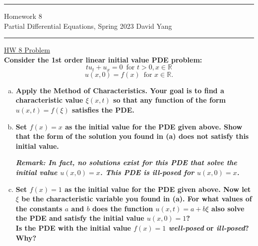 \documentclass[11pt]{article}
\begin{document}
	\hrule
	\begin{center}
		{\Large Homework 8} \\ %
		\vspace{0.2cm}
		Partial Differential Equations, Spring 2023 \hfill David Yang %
	\end{center}

\hrule

\vspace{1em}


\underline{HW 8 Problem} \\

\textbf{Consider the 1st order linear initial value PDE problem:
\[tu_t + u_x = 0 \, \, \, \text{for } t > 0, x \in \mathbb{R}\]
\[ u(x, 0) = f(x) \, \, \, \text{for } x \in \mathbb{R}.\]}

\begin{enumerate}[(a)]
    \item \textbf{Apply the Method of Characteristics. Your goal is to find a characteristic value $\xi(x, t)$ so that any function of the form $u(x, t) = f(\xi)$ satisfies the PDE.}
    \item \textbf{Set $f(x) = x$ as the initial value for the PDE given above. Show that the form of the solution you found in (a) does not satisfy this initial value. \\}
    
    \textbf{\textit{Remark: In fact, no solutions exist for this PDE that solve the initial value $u(x, 0) = x$. This PDE is ill-posed for $u(x, 0) = x$.}}
    \item \textbf{Set $f(x) = 1$ as the initial value for the PDE given above. Now let $\xi$ be the characteristic variable you found in (a). 
    For what values of the constants $a$ and $b$ does the function $u(x, t) = a + b\xi$ also solve the PDE and satisfy the initial value $u(x,0) = 1$?}\\

    \textbf{Is the PDE with the initial value $f(x) = 1$ \textit{well-posed} or \textit{ill-posed}? Why?}
\end{enumerate}
\end{document}
